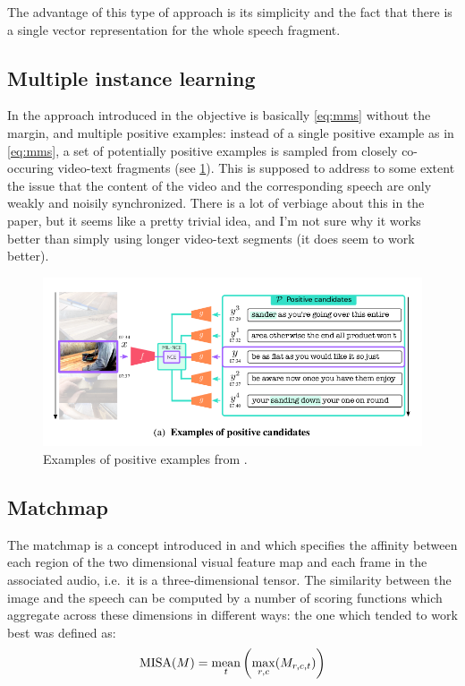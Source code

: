 The advantage of this type of approach is its simplicity and the fact
that there is a single vector representation for the whole speech
fragment.

\subsection{Multiple instance learning}
In the approach introduced in \citet{miech2020end} the objective is
basically \cref{eq:mms} without the margin, and multiple positive
examples: instead of a single positive example as in \cref{eq:mms}, a
set of potentially positive examples is sampled from closely
co-occuring video-text fragments (see \cref{fig:positive}). This is
supposed to address to some extent the issue that the content of the
video and the corresponding speech are only weakly and noisily
synchronized. There is a lot of verbiage about this in the paper, but
it seems like a pretty trivial idea, and I'm not sure why it works
better than simply using longer video-text segments (it does seem to
work better).
\begin{figure}
  \centering
  \includegraphics[scale=0.3]{positive}
  \caption{Examples of positive examples from \citet{miech2020end}.}
  \label{fig:positive}
\end{figure}

\subsection{Matchmap}
The matchmap is a concept introduced in \citet{harwath2018jointly} and
which specifies the affinity between each region of the two
dimensional visual feature map and each frame in the associated audio,
i.e.\ it is a three-dimensional tensor. The similarity between the
image and the speech can be computed by a number of scoring functions
which aggregate across these dimensions in different ways: the one
which tended to work best was defined as:
\begin{equation}
  \label{eq:misa}
  \mathrm{MISA}(M) = \operatorname*{mean}_t \left(\max_{r,c}(M_{r,c,t})\right)
\end{equation}

